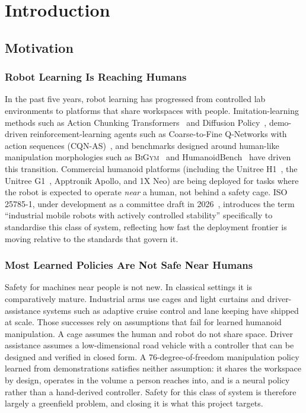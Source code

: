 \documentclass[11pt,a4paper]{report}
\newcommand{\bigym}{\textsc{BiGym}}
\newcommand{\cqnas}{CQN-AS}
\begin{document}
\chapter{Introduction}
\label{ch:intro}

\section{Motivation}
\label{sec:intro:motivation}

\subsection{Robot Learning Is Reaching Humans}
\label{sec:intro:mot:reaching}

In the past five years, robot learning has progressed from
controlled lab environments to platforms that share workspaces with
people. Imitation-learning methods such as Action Chunking
Transformers~\cite{zhao2023act} and Diffusion
Policy~\cite{chi2023diffusion}, demo-driven reinforcement-learning
agents such as Coarse-to-Fine Q-Networks with action sequences
(\cqnas{})~\cite{seo2024cqnas,seo2025actionsequence}, and benchmarks designed around
human-like manipulation morphologies such as
\bigym{}~\cite{chernyadev2024bigym} and
HumanoidBench~\cite{sferrazza2024humanoidbench} have driven this
transition. Commercial humanoid platforms (including the Unitree
H1~\cite{unitree_h1}, the Unitree G1~\cite{unitree_g1},
Apptronik Apollo, and 1X Neo) are being deployed for tasks where the
robot is expected to operate \emph{near} a human, not behind a
safety cage. ISO 25785-1, under development as a committee draft in
2026~\cite{iso25785},
introduces the term ``industrial mobile robots with actively
controlled stability'' specifically to standardise this class of
system, reflecting how fast the deployment frontier is moving
relative to the standards that govern it.

\subsection{Most Learned Policies Are Not Safe Near Humans}
\label{sec:intro:mot:unsafe}

Safety for machines near people is not new. In classical settings it
is comparatively mature. Industrial arms use cages and light curtains and
driver-assistance systems such as adaptive cruise control and lane
keeping have shipped at scale. Those successes rely on
assumptions that fail for learned humanoid manipulation. A cage assumes
the human and robot do not share space. Driver assistance assumes a
low-dimensional road vehicle with a controller that can be designed
and verified in closed form. A 76-degree-of-freedom manipulation policy
learned from demonstrations satisfies neither assumption: it shares the
workspace by design, operates in the volume a person reaches into, and
is a neural policy rather than a hand-derived controller. Safety for
this class of system is therefore largely a greenfield problem, and
closing it is what this project targets.
\end{document}
